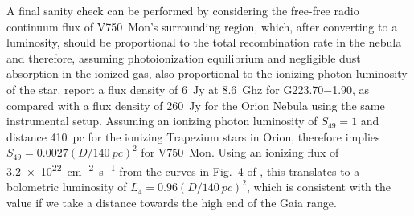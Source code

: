 \documentclass[useAMS, usenatbib, a4paper]{mnras}
\newcommand\hii{\ion{H}{ii}}
\begin{document}
A final sanity check can be performed by considering the free-free
radio continuum flux of V750~Mon's surrounding \hii{} region, which,
after converting to a luminosity, should be proportional to the total
recombination rate in the nebula and therefore, assuming
photoionization equilibrium and negligible dust absorption in the
ionized gas, also proportional to the ionizing photon luminosity of
the star.  \citet{Quireza:2006b} report a flux density of \SI{6}{Jy}
at \SI{8.6}{Ghz} for G\num{223.70}\num{-1.90}, as compared with a flux
density of \SI{260}{Jy} for the Orion Nebula using the same
instrumental setup.  Assuming an ionizing photon luminosity of
\(S_{49} = 1\) and distance \SI{410}{pc} for the ionizing Trapezium
stars in Orion, therefore implies
\(S_{49} = 0.0027 (D/\SI{140}{pc})^2\) for V750~Mon.  Using an
ionizing flux of \SI{3.2e22}{cm^{-2}.s^{-1}} from the curves in Fig.~4
of \citet{Sternberg:2003a}, this translates to a bolometric luminosity
of \(L_4 = 0.96 (D/\SI{140}{pc})^2\), which is consistent with the
\citet{Fairlamb:2015a} value if we take a distance towards the high
end of the Gaia range.










\bsp	%
\label{lastpage}
\end{document}
